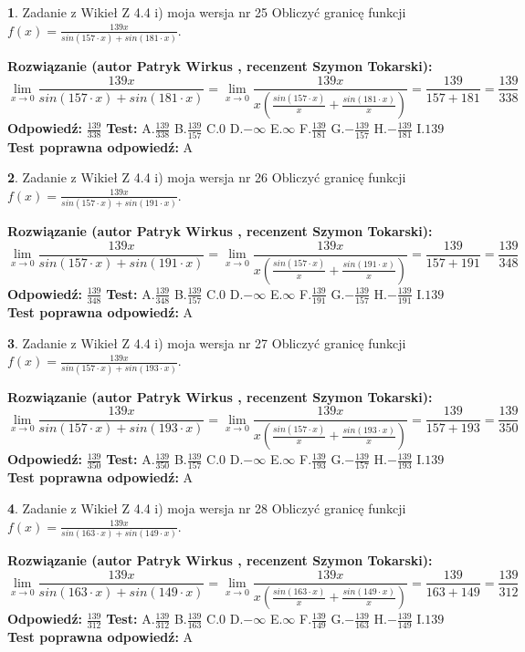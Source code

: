 \documentclass[12pt, a4paper]{article}
\theoremstyle{definition} %
\newtheorem{zad}{}
\newcommand{\zadStart}[1]{\begin{zad}#1\newline}
\newcommand{\zadStop}{\end{zad}}
\newcommand{\rozwStart}[2]{\noindent \textbf{Rozwiązanie (autor #1 , recenzent #2): }\newline}
\newcommand{\rozwStop}{\newline}
\newcommand{\odpStart}{\noindent \textbf{Odpowiedź:}\newline}
\newcommand{\odpStop}{\newline}
\newcommand{\testStart}{\noindent \textbf{Test:}\newline}
\newcommand{\testStop}{\newline}
\newcommand{\kluczStart}{\noindent \textbf{Test poprawna odpowiedź:}\newline}
\newcommand{\kluczStop}{\newline}
\begin{document}
\zadStart{Zadanie z Wikieł Z 4.4 i) moja wersja nr 25}
Obliczyć granicę funkcji $f(x)=\frac{139x}{sin(157\cdot x) +sin(181\cdot x)}$.
\zadStop
\rozwStart{Patryk Wirkus}{Szymon Tokarski}
$$\lim\limits_{x\to 0}\frac{139x}{sin(157\cdot x) +sin(181\cdot x)}=\lim\limits_{x\to 0}\frac{139x}{x(\frac{sin(157\cdot x)}{x}+\frac{sin(181\cdot x)}{x})}=\frac{139}{157+181} = \frac{139}{338}$$
\rozwStop
\odpStart
$\frac{139}{338}$
\odpStop
\testStart
A.$\frac{139}{338}$
B.$\frac{139}{157}$
C.$0$
D.$-\infty$
E.$\infty$
F.$\frac{139}{181}$
G.$-\frac{139}{157}$
H.$-\frac{139}{181}$
I.$139$
\testStop
\kluczStart
A
\kluczStop



\zadStart{Zadanie z Wikieł Z 4.4 i) moja wersja nr 26}
Obliczyć granicę funkcji $f(x)=\frac{139x}{sin(157\cdot x) +sin(191\cdot x)}$.
\zadStop
\rozwStart{Patryk Wirkus}{Szymon Tokarski}
$$\lim\limits_{x\to 0}\frac{139x}{sin(157\cdot x) +sin(191\cdot x)}=\lim\limits_{x\to 0}\frac{139x}{x(\frac{sin(157\cdot x)}{x}+\frac{sin(191\cdot x)}{x})}=\frac{139}{157+191} = \frac{139}{348}$$
\rozwStop
\odpStart
$\frac{139}{348}$
\odpStop
\testStart
A.$\frac{139}{348}$
B.$\frac{139}{157}$
C.$0$
D.$-\infty$
E.$\infty$
F.$\frac{139}{191}$
G.$-\frac{139}{157}$
H.$-\frac{139}{191}$
I.$139$
\testStop
\kluczStart
A
\kluczStop



\zadStart{Zadanie z Wikieł Z 4.4 i) moja wersja nr 27}
Obliczyć granicę funkcji $f(x)=\frac{139x}{sin(157\cdot x) +sin(193\cdot x)}$.
\zadStop
\rozwStart{Patryk Wirkus}{Szymon Tokarski}
$$\lim\limits_{x\to 0}\frac{139x}{sin(157\cdot x) +sin(193\cdot x)}=\lim\limits_{x\to 0}\frac{139x}{x(\frac{sin(157\cdot x)}{x}+\frac{sin(193\cdot x)}{x})}=\frac{139}{157+193} = \frac{139}{350}$$
\rozwStop
\odpStart
$\frac{139}{350}$
\odpStop
\testStart
A.$\frac{139}{350}$
B.$\frac{139}{157}$
C.$0$
D.$-\infty$
E.$\infty$
F.$\frac{139}{193}$
G.$-\frac{139}{157}$
H.$-\frac{139}{193}$
I.$139$
\testStop
\kluczStart
A
\kluczStop



\zadStart{Zadanie z Wikieł Z 4.4 i) moja wersja nr 28}
Obliczyć granicę funkcji $f(x)=\frac{139x}{sin(163\cdot x) +sin(149\cdot x)}$.
\zadStop
\rozwStart{Patryk Wirkus}{Szymon Tokarski}
$$\lim\limits_{x\to 0}\frac{139x}{sin(163\cdot x) +sin(149\cdot x)}=\lim\limits_{x\to 0}\frac{139x}{x(\frac{sin(163\cdot x)}{x}+\frac{sin(149\cdot x)}{x})}=\frac{139}{163+149} = \frac{139}{312}$$
\rozwStop
\odpStart
$\frac{139}{312}$
\odpStop
\testStart
A.$\frac{139}{312}$
B.$\frac{139}{163}$
C.$0$
D.$-\infty$
E.$\infty$
F.$\frac{139}{149}$
G.$-\frac{139}{163}$
H.$-\frac{139}{149}$
I.$139$
\testStop
\kluczStart
A
\kluczStop
\end{document}
